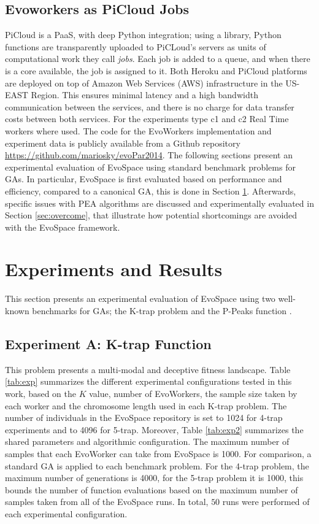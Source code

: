 \subsection{Evoworkers as PiCloud Jobs}
PiCloud is a PaaS, with deep Python integration; 
using a library, Python functions are transparently uploaded to PiCLoud's 
servers as units of computational work they call \emph{jobs}. 
Each job is added to a queue, and when there is a core available, 
the job is assigned to it. Both Heroku and PiCloud 
platforms are deployed on top of Amazon Web Services (AWS) 
infrastructure in the US-EAST Region. This ensures minimal 
latency and a high bandwidth communication between the services, 
and there is no charge for data transfer costs between both services.
For the experiments type c1 and c2 Real Time workers where used.  
The code for the EvoWorkers implementation and experiment data is publicly available from a Github repository \url{https://github.com/mariosky/evoPar2014}. 
The following sections present an experimental evaluation of EvoSpace using standard benchmark problems for GAs.
In particular, EvoSpace is first evaluated based on performance and efficiency, compared to a canonical GA, this is done
in Section \ref{sec:exp1}.
Afterwards, specific issues with PEA algorithms are discussed and experimentally evaluated in Section \ref{sec:overcome},
that illustrate how potential shortcomings are avoided with the EvoSpace framework.


\section{Experiments and Results}
\label{sec:exp1}
This section presents an experimental evaluation of EvoSpace using two well-known benchmarks for GAs;
the K-trap problem \cite{trap} and the P-Peaks function \cite{Jong:PS97}.

\subsection{Experiment A: K-trap Function}
This problem presents a multi-modal and deceptive fitness landscape.
Table \ref{tab:exp} summarizes the different experimental configurations tested in this work, based on the $K$ value, number of EvoWorkers, the sample size taken by each worker and the chromosome length used in each K-trap problem. The number of individuals in the EvoSpace repository is set to 1024 for 4-trap experiments and to 4096 for 5-trap.
Moreover, Table \ref{tab:exp2} summarizes the shared parameters and algorithmic configuration.
The maximum number of samples that each EvoWorker can take from EvoSpace is 1000.
For comparison, a standard GA is applied to each benchmark problem.
For the 4-trap problem, the maximum number of generations is 4000, for the 5-trap problem it is 1000,
this bounds the number of function evaluations based on the maximum number of samples taken from all of the EvoSpace runs.
In total, $50$ runs were performed of each experimental configuration.


